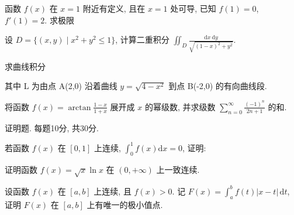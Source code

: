 \par{}
函数 $f(x)$ 在 $x = 1$ 附近有定义, 且在 $x = 1$ 处可导, 已知 $f(1) = 0$, $f'(1) = 2$. 求极限\par
\nopagebreak[4]
设 $D = \{(x, y) \mid x^2 + y^2 \leq 1\}$, 计算二重积分 $\iint_{D} \frac{\mathrm{d}x \mathrm{~d}y}{\sqrt{(1 - x)^2 + y^2}}$.\par
\par{}
求曲线积分\par
\nopagebreak[4]
其中 L 为由点 A(2,0) 沿着曲线  $y=\sqrt{4-x^{2}}$  到点 B(-2,0) 的有向曲线段.\par
将函数 $f(x) = \arctan \frac{1 - x}{1 + x}$ 展开成 $x$ 的幂级数, 并求级数 $\sum_{n=0}^{\infty} \frac{(-1)^n}{2n+1}$ 的和.\par
\par{}
证明题. 每题10分, 共30分.\par
\par{}
若函数 $f(x)$ 在 $[0,1]$ 上连续, $\int_0^1 f(x)\mathrm{d}x = 0$, 证明:\par
\nopagebreak[4]
证明函数 $f(x) = \sqrt{x} \ln x$ 在 $(0, +\infty)$ 上一致连续.\par
设函数 $f(x)$ 在 $[a, b]$ 上连续, 且 $f(x) > 0$. 记 $F(x) = \int_{a}^{b} f(t) |x - t| \, \mathrm{d}t$, 证明 $F(x)$ 在 $[a, b]$ 上有唯一的极小值点.\par

